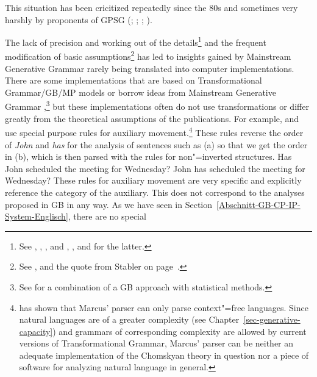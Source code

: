 This situation has been cricitized repeatedly since the 80s and sometimes very harshly by proponents of GPSG 
(\citealp*[]{GKPS85a};
\citealp{Pullum85a,Pullum89b}; \citealp[]{Pullum91b}; \citealp{KP90a}). 

The lack of precision and working out of the details\footnote{
	See \eg {}, , ,  and , ,  and
   for the latter. 
} and the frequent modification of basic assumptions\footnote{
	See \eg {},  and the quote from Stabler on page~\pageref{Zitat-Stabler}.
} has led to insights gained by Mainstream Generative Grammar rarely being translated into computer implementations.
There are some implementations that are based on Transformational Grammar/GB/MP models or borrow ideas from Mainstream
Generative Grammar
\citep*{Petrick65a-u,ZFHW65a,Kay67a,Friedman69a,FBDPM71a-u,Morin73a-u,Marcus80a-u,AC86a,Kuhns86a,Correra87a,Stabler87a,Stabler92a-u,Stabler2001a,KT91a,Fong91a-u,CL92a,Lohnstein93a-u,FC94a,Nordgard94a,Veenstra98a,%
FG2012a%
},\footnote{
  See  for a combination of a GB approach with statistical methods.
}
but these implementations often do not use transformations or differ greatly from the theoretical assumptions of the
publications. For example, \citet[--104]{Marcus80a-u} and
\citet[]{Stabler87a} use special purpose rules for auxiliary movement.\footnote{
  \citet{NF86a-u,NF87a-u} has shown that Marcus' parser can only parse context"=free languages. Since natural languages
  are of a greater complexity (see Chapter~\ref{sec-generative-capacity}) and grammars of corresponding complexity
  are allowed by current versions of Transformational Grammar, Marcus' parser can be neither an adequate implementation of
  the Chomskyan theory in question nor a piece of software for analyzing natural language in general.
}
These rules reverse the order of \emph{John} and \emph{has} for the analysis of sentences such as (a) so that we get the order in
  (b), which is then parsed with the rules for non"=inverted structures.
\eal
\ex Has John scheduled the meeting for Wednesday?
\ex John has scheduled the meeting for Wednesday?
\zl
These rules for auxiliary movement are very specific and explicitly reference the category of the auxiliary. This does not correspond
to the analyses proposed in GB in any way. As we have seen in Section~\ref{Abschnitt-GB-CP-IP-System-Englisch}, there are no special
